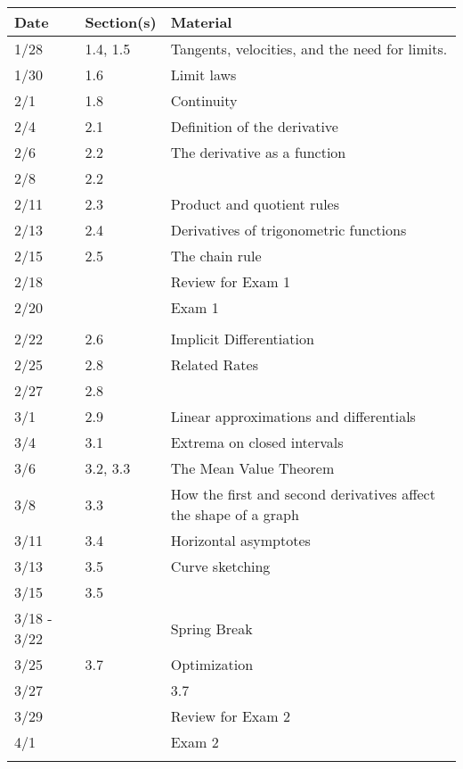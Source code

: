 \begin{center}
  \begin{longtable}{lll}
    Date & Section(s) & Material\\
    \hline
    1/28 & 1.4, 1.5 & Tangents, velocities, and the need for limits.\\
    1/30 & 1.6 & Limit laws\\
    2/1 & 1.8 & Continuity\\
    2/4 & 2.1 & Definition of the derivative\\
    2/6 & 2.2 & The derivative as a function\\
    2/8 & 2.2 \\
    2/11 & 2.3 & Product and quotient rules\\
    2/13 & 2.4 & Derivatives of trigonometric functions\\
    2/15 & 2.5 & The chain rule\\
    2/18 & & Review for Exam 1\\
    2/20 & & Exam 1\\
    \hline\\
    2/22 & 2.6 & Implicit Differentiation\\
    2/25 & 2.8 & Related Rates\\
    2/27 & 2.8\\
    3/1 & 2.9 & Linear approximations and differentials\\
    3/4 & 3.1 & Extrema on closed intervals\\
    3/6 & 3.2, 3.3 & The Mean Value Theorem\\
    3/8 & 3.3 & How the first and second derivatives affect the shape of a graph\\
    3/11 & 3.4  & Horizontal asymptotes\\
    3/13 & 3.5 & Curve sketching\\
    3/15 & 3.5\\
    3/18 - 3/22 & & Spring Break\\
    3/25 & 3.7 & Optimization\\
    3/27 & & 3.7 \\
    3/29 & & Review for Exam 2\\
    4/1 & & Exam 2\\
    \hline\\
    

\end{longtable}
\end{center}
